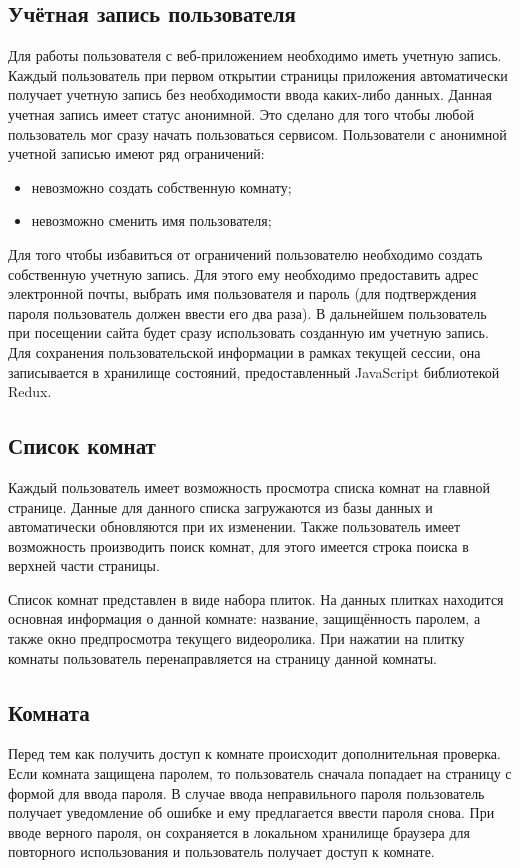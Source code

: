 \subsection{Учётная запись пользователя}
Для работы пользователя с веб-приложением необходимо иметь учетную запись. Каждый пользователь при первом открытии страницы приложения автоматически получает учетную запись без необходимости ввода каких-либо данных. Данная учетная запись имеет статус анонимной. Это сделано для того чтобы любой пользователь мог сразу начать пользоваться сервисом. Пользователи с анонимной учетной записью имеют ряд ограничений:
\begin{itemize}
 \item невозможно создать собственную комнату;
 \item невозможно сменить имя пользователя;
\end{itemize}
 
Для того чтобы избавиться от ограничений пользователю необходимо создать собственную учетную запись. Для этого ему необходимо предоставить адрес электронной почты, выбрать имя пользователя и пароль (для подтверждения пароля пользователь должен ввести его два раза). 
В дальнейшем пользователь при посещении сайта будет сразу использовать созданную им учетную запись.
Для сохранения пользовательской информации в рамках текущей сессии, она записывается в хранилище состояний, предоставленный JavaScript библиотекой Redux.
 
\subsection{Список комнат}
Каждый пользователь имеет возможность просмотра списка комнат на главной странице. Данные для данного списка загружаются из базы данных и автоматически обновляются при их изменении.
Также пользователь имеет возможность производить поиск комнат, для этого имеется строка поиска в верхней части страницы.
 
Список комнат представлен в виде набора плиток. На данных плитках находится основная информация о данной комнате: название, защищённость паролем, а также окно предпросмотра текущего видеоролика. 
При нажатии на плитку комнаты пользователь перенаправляется на страницу данной комнаты. 

\subsection{Комната}
Перед тем как получить доступ к комнате происходит дополнительная проверка. 
Если комната защищена паролем, то пользователь сначала попадает на страницу с формой для ввода пароля. 
В случае ввода неправильного пароля пользователь получает уведомление об ошибке и ему предлагается ввести пароля снова. 
При вводе верного пароля, он сохраняется в локальном хранилище браузера для повторного использования и пользователь получает доступ к комнате. 

